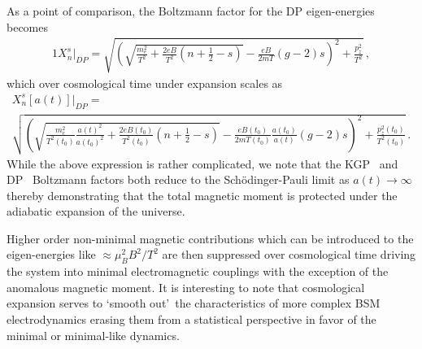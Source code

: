 As a point of comparison, the Boltzmann factor for the DP eigen-energies becomes
\begin{alignat}{1}
    \label{XDP} X_{n}^{s}\vert_{DP} = \sqrt{\left(\sqrt{\frac{m_{e}^{2}}{T^{2}}+\frac{2eB}{T^{2}}\left(n+\frac{1}{2}-s\right)}-\frac{eB}{2mT}(g-2)s\right)^{2}+\frac{p_{z}^{2}}{T^{2}}}\,,
\end{alignat}
which over cosmological time under expansion scales as
\begin{multline}
    \label{XScaleDP} X_{n}^{s}[a(t)]\vert_{DP} =\\ \sqrt{\left(\sqrt{\frac{m_{e}^{2}}{T^{2}(t_{0})}\frac{a(t)^{2}}{a(t_{0})^{2}}+\frac{2eB(t_{0})}{T^{2}(t_{0})}\left(n+\frac{1}{2}-s\right)}-\frac{eB(t_{0})}{2mT(t_{0})}\frac{a(t_{0})}{a(t)}(g-2)s\right)^{2}+\frac{p_{z}^{2}(t_{0})}{T^{2}(t_{0})}}\,.
\end{multline}
While the above expression is rather complicated, we note that the KGP~ and DP~ Boltzmann factors both reduce to the Sch{\"o}dinger-Pauli limit as $a(t)\rightarrow\infty$ thereby demonstrating that the total magnetic moment is protected under the adiabatic expansion of the universe.

Higher order non-minimal magnetic contributions which can be introduced to the eigen-energies like $\approx\mu_{B}^{2}B^{2}/T^{2}$ are then suppressed over cosmological time driving the system into minimal electromagnetic couplings with the exception of the anomalous magnetic moment. It is interesting to note that cosmological expansion serves to \lq smooth out\rq\ the characteristics of more complex BSM electrodynamics erasing them from a statistical perspective in favor of the minimal or minimal-like dynamics.